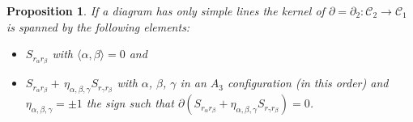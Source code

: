 \documentclass[pdftex]{sigma}
\numberwithin{equation}{section}
\newtheorem{Proposition}[Theorem]{Proposition}
 { \theoremstyle{definition}
\newtheorem{Definition}[Theorem]{Definition}
\newtheorem{Note}[Theorem]{Note}
\newtheorem{Example}[Theorem]{Example}
\newtheorem{Remark}[Theorem]{Remark} }
\begin{document}
\begin{Proposition}\label{pro.single}If a diagram has only simple lines the kernel of $\partial =\partial _{2}\colon \mathcal{C}_{2}\longrightarrow \mathcal{C}_{1}$ is spanned by the following elements:
\begin{itemize}\itemsep=0pt
\item $S_{r_{\alpha }r_{\beta }}$ with $ \langle \alpha,\beta \rangle =0$ and

\item $S_{r_{\alpha }r_{\beta }}+\,\eta _{\alpha,\beta,\gamma }S_{r_{\gamma }r_{\beta }}$ with $\alpha$, $\beta$, $\gamma $ in an $A_{3}$ configuration (in this order) and $\eta _{\alpha,\beta,\gamma }=\pm 1$ the
sign such that $\partial ( S_{r_{\alpha }r_{\beta }}+\eta _{\alpha,\beta,\gamma }S_{r_{\gamma }r_{\beta }} ) =0$.
\end{itemize}
\end{Proposition}
\end{document}
